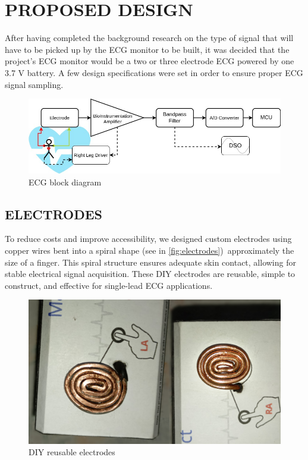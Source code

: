 \chapter{PROPOSED DESIGN}
After having completed the background research on the type of signal that will have to be picked up by the ECG monitor to be built, it was decided that the project's ECG monitor would be a two or three electrode ECG powered by one 3.7 V battery. A few design specifications were set in order to ensure proper ECG signal sampling.

\begin{figure}[H]
    \centering
    \includegraphics[scale=0.5]{images/ecg_block_diagram.jpg}
    \caption{ECG block diagram}
    \label{fig:ecg_block_diagram}
\end{figure}

\section{ELECTRODES}
To reduce costs and improve accessibility, we designed custom electrodes using copper wires bent into a spiral shape (see in \autoref{fig:electrodes})\, approximately the size of a finger. This spiral structure ensures adequate skin contact, allowing for stable electrical signal acquisition. These DIY electrodes are reusable, simple to construct, and effective for single-lead ECG applications.
\begin{figure}[H]
    \centering
    \includegraphics[scale=3]{images/electrode.jpg}
    \caption{DIY reusable electrodes}
    \label{fig:electrodes}
\end{figure}


